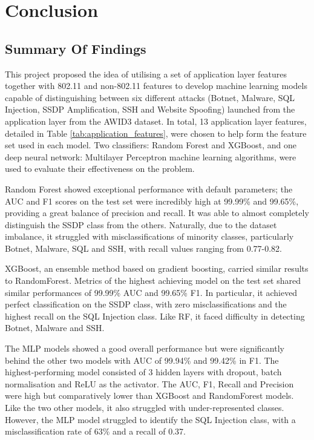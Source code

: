 
\section{Conclusion}
\label{sec: Conclusion}


\subsection{Summary Of Findings}

This project proposed the idea of utilising a set of application layer features together with 802.11 and non-802.11 features to develop machine learning models capable of distinguishing between six different attacks (Botnet, Malware, SQL Injection, SSDP Amplification, SSH and Website Spoofing) launched from the application layer from the AWID3 dataset. In total, 13 application layer features, detailed in Table \ref{tab:application_features}, were chosen to help form the feature set used in each model. Two classifiers: Random Forest and XGBoost, and one deep neural network: Multilayer Perceptron machine learning algorithms, were used to evaluate their effectiveness on the problem. 

\medskip
Random Forest showed exceptional performance with default parameters; the AUC and F1 scores on the test set were incredibly high at 99.99\% and 99.65\%, providing a great balance of precision and recall. It was able to almost completely distinguish the SSDP class from the others. Naturally, due to the dataset imbalance, it struggled with misclassifications of minority classes, particularly Botnet, Malware, SQL and SSH, with recall values ranging from 0.77-0.82. 

\smallskip
XGBoost, an ensemble method based on gradient boosting, carried similar results to RandomForest. Metrics of the highest achieving model on the test set shared similar performances of 99.99\% AUC and 99.65\% F1. In particular, it achieved perfect classification on the SSDP class, with zero misclassifications and the highest recall on the SQL Injection class. Like RF, it faced difficulty in detecting Botnet, Malware and SSH.

\smallskip
The MLP models showed a good overall performance but were significantly behind the other two models with AUC of 99.94\% and 99.42\% in F1. The highest-performing model consisted of 3 hidden layers with dropout, batch normalisation and ReLU as the activator. The AUC, F1, Recall and Precision were high but comparatively lower than XGBoost and RandomForest models. Like the two other models, it also struggled with under-represented classes. However, the MLP model struggled to identify the SQL Injection class, with a misclassification rate of 63\% and a recall of 0.37. 

